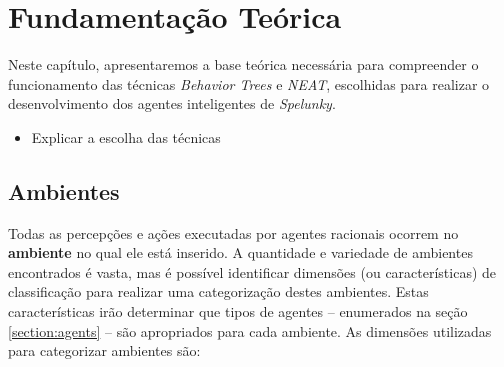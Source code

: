 \chapter{\label{chap:theory}Fundamentação Teórica}
Neste capítulo, apresentaremos a base teórica necessária para compreender o
funcionamento das técnicas \textit{Behavior Trees} e \textit{NEAT}, escolhidas
para realizar o desenvolvimento dos agentes inteligentes de \textit{Spelunky}.

\begin{mdframed}[backgroundcolor=green!20]
\begin{itemize}
	\item
		Explicar a escolha das técnicas
\end{itemize}
\end{mdframed}


\section{\label{section:environment}Ambientes}
Todas as percepções e ações executadas por agentes racionais ocorrem no
\textbf{ambiente} no qual ele está inserido. A quantidade e variedade de
ambientes encontrados é vasta, mas é possível identificar dimensões (ou
características) de classificação para realizar uma categorização destes
ambientes. Estas características irão determinar que tipos de agentes --
enumerados na seção \ref{section:agents} -- são apropriados para cada ambiente.
As dimensões utilizadas para categorizar ambientes são:

